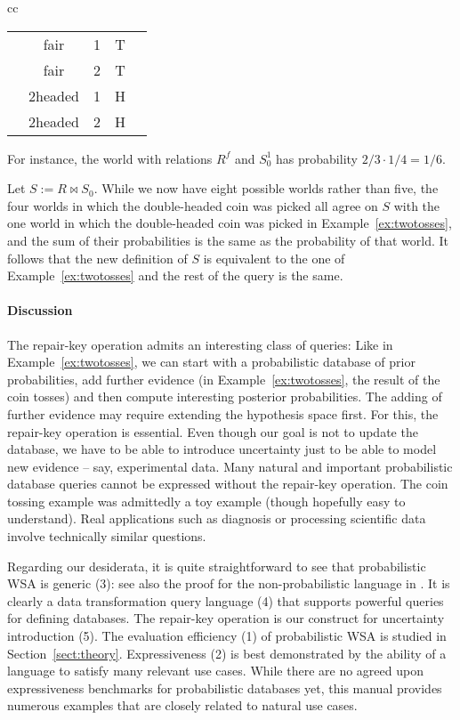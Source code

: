 \begin{example}
{\begin{center}
\begin{tabular}{cc}
\begin{tabular}{@{~}c@{~}|@{~}c@{~~}c@{~~}c@{~~}c@{~}}
\hline
& fair     &  1   & T \\
& fair     &  2   & T \\
& 2headed  &  1   & H \\
& 2headed  &  2   & H \\
\end{tabular}
\end{tabular}
\end{center}
%
For instance, the world with relations $R^{f}$ and $S_0^1$ has probability $2/3 \cdot 1/4 = 1/6$.
} %
%
Let $S := R \bowtie S_0$.
While we now have eight possible worlds rather than five, the four worlds in which the double-headed coin was picked
all agree on $S$ with the one world in which the double-headed coin was picked in Example~\ref{ex:twotosses}, and the sum of their probabilities is the same as the probability of that world.
It follows that the new definition of $S$ is equivalent to the one of
Example~\ref{ex:twotosses} and the rest of the query is the same.
%
\punto
\end{example}




\paragraph{Discussion}
%
The repair-key operation admits an interesting class of queries:
Like in Example~\ref{ex:twotosses}, we can start with a probabilistic database of prior probabilities, add further evidence (in Example~\ref{ex:twotosses}, the result of
the coin tosses) and then compute interesting posterior probabilities. The adding of further
evidence may require extending the hypothesis space first. For this, the repair-key operation is
essential. Even though our goal is not to update the database, we have to be able to introduce uncertainty just to be able to model new evidence -- say, experimental data.
Many natural and important probabilistic database queries cannot be expressed without the repair-key operation. The coin tossing example was admittedly a toy example (though hopefully easy to understand). Real applications such as diagnosis or processing scientific data involve technically similar questions.

Regarding our desiderata, it is quite straightforward to see that probabilistic WSA is generic (3):
see also the proof for the non-probabilistic language in \cite{AKO07ISQL}. It is clearly a data transformation query language (4) that supports powerful queries for defining databases. The repair-key operation is our construct for uncertainty introduction (5). The evaluation efficiency (1) of probabilistic WSA is studied in Section~\ref{sect:theory}. Expressiveness (2) is best demonstrated by the ability of a language to satisfy many relevant use cases. While there are no agreed upon expressiveness benchmarks for probabilistic databases yet, this manual provides numerous examples that are closely related to natural use cases.






